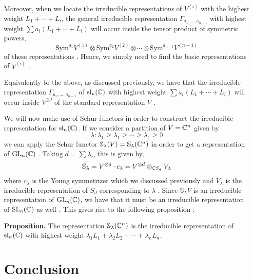 \documentclass[11pt, a4paper, oneside]{article}
\theoremstyle{plain}
\theoremstyle{definition}
\theoremstyle{example}
\def\GL{\mathrm{GL}} \def\SL{\mathrm{SL}} \def\sl{\mathrm{sl}} \def\gl{\mathrm{gl}} \def\SO{\mathrm{SO}} \def\SU{\mathrm{SU}}  \def\SP{\mathrm{SP}} \def\g{\mathfrak{g}} \def\h{\mathfrak{h}} \def\Sym{\mathrm{Sym}}
\begin{document}
Moreover, when we locate the irreducible representations of $V^{(i)}$ with the highest weight $L_1 + \cdots + L_i$, the general irreducible representation $\Gamma_{a_1, \ldots, a_{n-1}}$ with highest weight $\sum a_i (L_1 + \cdots + L_i)$ will occur inside the tensor product of symmetric powers, $$\Sym^{a_1}V^{(1)} \otimes \Sym^{a_2}V^{(2)} \otimes \cdots \otimes \Sym^{a_{n-1}} V^{(n-1)}$$ of these representations \cite[\S 15.1]{fulton}. Hence, we simply need to find the basic representations of $V^{(i)}$ \cite[\S 15.1]{fulton}.

\par
Equivalently to the above, as discussed previously, we have that the irreducible representation $\Gamma_{a_1, \ldots, a_{n-1}}$ of $\sl_n(\CC)$ with highest weight $\sum a_i (L_1 + \cdots + L_i)$ will occur inside $V^{\otimes d}$ of the standard representation $V$ \cite[\S 15.3]{fulton}.

\par
We will now make use of Schur functors in order to construct the irreducible representation for $\sl_n(\CC)$. If we consider a partition of $V = \mathbb{C}^n$ given by $$\lambda: \lambda_1 \geq \lambda_1 \geq \cdots \geq \lambda_1 \geq 0$$ we can apply the Schur functor $\mathbb{S}_{\lambda}(V) = \mathbb{S}_{\lambda}(\mathbb{C}^n)$ in order to get a representation of $\GL_n(\CC)$ \cite[\S 15.3]{fulton}. Taking $d = \sum \lambda_i$, this is given by, $$\mathbb{S}_{\lambda} = V^{\otimes d}\cdot c_{\lambda} = V^{\otimes d} \otimes_{\mathbb{C} S_d} V_{\lambda}$$ where $c_{\lambda}$ is the Young symmetrizer which we discussed previously and $V_{\lambda}$ is the irreducible representation of $S_d$ corresponding to $\lambda$ \cite[\S 15.3]{fulton}. Since $\mathbb{S}_{\lambda}V$ is an irreducible representation of $\GL_n(\CC)$, we have that it must be an irreducible representation of $\SL_n(\CC)$ as well \cite[\S 15.3]{fulton}. This gives rise to the following proposition \cite[\S 15.3, Proposition 15.15]{fulton}:

\par
\textbf{Proposition.} The representation $\mathbb{S}_{\lambda}(\mathbb{C}^n)$ is the irreducible representation of $\sl_n(\CC)$ with highest weight $\lambda_1 L_1 + \lambda_2 L_2 + \cdots + \lambda_n L_n$.



\section{Conclusion}
\end{document}
